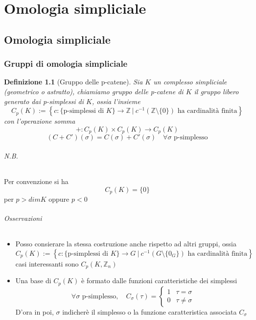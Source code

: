 \documentclass[a4paper]{report}
\newtheorem{definition}{Definizione}
\newcommand{\Z}{\ensuremath{\mathbb{Z}}}
\newcommand{\ra}{\ensuremath{\rightarrow}}
\newcommand{\setst}[2]{\ensuremath{\left\{{#1}\ |\ {#2}\right\}}}
\begin{document}
\part{Omologia simpliciale}
\chapter{Omologia simpliciale}
\section{Gruppi di omologia simpliciale}
\begin{definition}[Gruppo delle p-catene]
    Sia $K$ un complesso simpliciale (geometrico o astratto), chiamiamo gruppo delle p-catene di $K$ il gruppo libero generato dai p-simplessi di $K$, ossia l'insieme
    \[
        C_p(K):=\setst{c:\{\text{p-simplessi di }K\}\ra\Z}{c^{-1}(\Z\setminus\{0\})\text{ ha cardinalità finita}}
    \]
    con l'operazione somma
    \[
        +:C_p(K)\times C_p(K)\ra C_p(K)
    \]
    \[
        (C+C')(\sigma)=C(\sigma)+ C'(\sigma)\quad \forall\sigma\text{ p-simplesso}
    \]
\end{definition}
\paragraph{N.B.} Per convenzione si ha
\[
    C_p(K)=\{0\}
\]
per $p>dim K$ oppure $p<0$
\paragraph{Osservazioni}
\begin{itemize}
    \item Posso consierare la stessa costruzione anche rispetto ad altri gruppi, ossia
          \[
              C_p(K):=\setst{c:\{\text{p-simplessi di }K\}\ra G}{c^{-1}(G\setminus\{0_G\})\text{ ha cardinalità finita}}
          \]
          casi interessanti sono $C_p(K,\Z_n)$
    \item Una base di $C_p(K)$ è formato dalle funzioni caratteristiche dei simplessi
          \[
              \forall\sigma\text{ p-simplesso},\quad C_\sigma(\tau)=\left\{\begin{array}{ll}
                  1 & \tau=\sigma    \\
                  0 & \tau\neq\sigma
              \end{array}\right.
          \]
          D'ora in poi, $\sigma$ indicherè il simplesso o la funzione caratteristica associata $C_\sigma$
\end{itemize}
\end{document}
